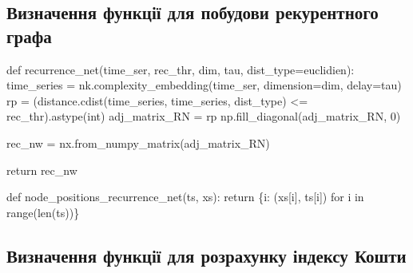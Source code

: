 \documentclass[
  letterpaper,
]{report}
\newenvironment{Shaded}{\begin{snugshade}}{\end{snugshade}}
\newcommand{\BuiltInTok}[1]{\textcolor[rgb]{0.00,0.23,0.31}{#1}}
\newcommand{\ControlFlowTok}[1]{\textcolor[rgb]{0.00,0.23,0.31}{#1}}
\newcommand{\DecValTok}[1]{\textcolor[rgb]{0.68,0.00,0.00}{#1}}
\newcommand{\KeywordTok}[1]{\textcolor[rgb]{0.00,0.23,0.31}{#1}}
\newcommand{\NormalTok}[1]{\textcolor[rgb]{0.00,0.23,0.31}{#1}}
\newcommand{\OperatorTok}[1]{\textcolor[rgb]{0.37,0.37,0.37}{#1}}
\newcommand{\StringTok}[1]{\textcolor[rgb]{0.13,0.47,0.30}{#1}}
\begin{document}
\hypertarget{ux432ux438ux437ux43dux430ux447ux435ux43dux43dux44f-ux444ux443ux43dux43aux446ux456ux457-ux434ux43bux44f-ux43fux43eux431ux443ux434ux43eux432ux438-ux440ux435ux43aux443ux440ux435ux43dux442ux43dux43eux433ux43e-ux433ux440ux430ux444ux430}{%
\subsection{Визначення функції для побудови рекурентного
графа}\label{ux432ux438ux437ux43dux430ux447ux435ux43dux43dux44f-ux444ux443ux43dux43aux446ux456ux457-ux434ux43bux44f-ux43fux43eux431ux443ux434ux43eux432ux438-ux440ux435ux43aux443ux440ux435ux43dux442ux43dux43eux433ux43e-ux433ux440ux430ux444ux430}}

\begin{Shaded}
\begin{Highlighting}[]
\KeywordTok{def}\NormalTok{ recurrence\_net(time\_ser, rec\_thr, dim, tau, dist\_type}\OperatorTok{=}\StringTok{\textquotesingle{}euclidien\textquotesingle{}}\NormalTok{):}
\NormalTok{    time\_series }\OperatorTok{=}\NormalTok{ nk.complexity\_embedding(time\_ser, dimension}\OperatorTok{=}\NormalTok{dim, delay}\OperatorTok{=}\NormalTok{tau)}
\NormalTok{    rp }\OperatorTok{=}\NormalTok{ (distance.cdist(time\_series, time\_series, dist\_type) }\OperatorTok{\textless{}=}\NormalTok{ rec\_thr).astype(}\BuiltInTok{int}\NormalTok{)}
\NormalTok{    adj\_matrix\_RN }\OperatorTok{=}\NormalTok{ rp}
\NormalTok{    np.fill\_diagonal(adj\_matrix\_RN, }\DecValTok{0}\NormalTok{)}

\NormalTok{    rec\_nw }\OperatorTok{=}\NormalTok{ nx.from\_numpy\_matrix(adj\_matrix\_RN)}
    
    \ControlFlowTok{return}\NormalTok{ rec\_nw}

\KeywordTok{def}\NormalTok{ node\_positions\_recurrence\_net(ts, xs):}
    \ControlFlowTok{return}\NormalTok{ \{i: (xs[i], ts[i]) }\ControlFlowTok{for}\NormalTok{ i }\KeywordTok{in} \BuiltInTok{range}\NormalTok{(}\BuiltInTok{len}\NormalTok{(ts))\}}
\end{Highlighting}
\end{Shaded}

\hypertarget{ux432ux438ux437ux43dux430ux447ux435ux43dux43dux44f-ux444ux443ux43dux43aux446ux456ux457-ux434ux43bux44f-ux440ux43eux437ux440ux430ux445ux443ux43dux43aux443-ux456ux43dux434ux435ux43aux441ux443-ux43aux43eux448ux442ux438}{%
\subsection{Визначення функції для розрахунку індексу
Кошти}\label{ux432ux438ux437ux43dux430ux447ux435ux43dux43dux44f-ux444ux443ux43dux43aux446ux456ux457-ux434ux43bux44f-ux440ux43eux437ux440ux430ux445ux443ux43dux43aux443-ux456ux43dux434ux435ux43aux441ux443-ux43aux43eux448ux442ux438}}
\end{document}
